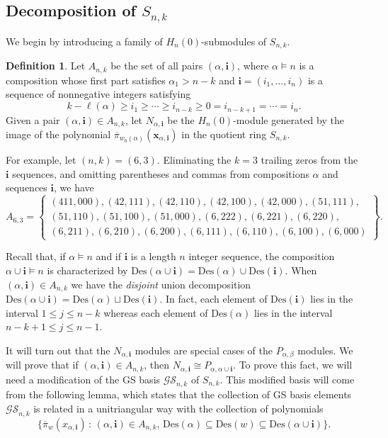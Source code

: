 \documentclass[10pt]{amsart}
\theoremstyle{definition}
\newtheorem{defn}[theorem]{Definition}
\newcommand{\Des}{{\mathrm {Des}}}
\newcommand{\GS}{{\mathcal{GS}}}
\newcommand{\xx}{{\mathbf {x}}}
\newcommand{\ii}{{\mathbf{i}}}
\newcommand{\pib}{\overline{\pi}}
\begin{document}
\subsection{Decomposition of $S_{n,k}$}
We begin by introducing a family of $H_n(0)$-submodules of $S_{n,k}$.

\begin{defn}
Let $A_{n,k}$ be the set of all pairs $(\alpha, \ii)$, where $\alpha \models n$ 
is a composition whose first part satisfies $\alpha_1> n-k$
and $\ii = (i_1, \dots, i_n)$ is a sequence of nonnegative integers satisfying 
\begin{equation*}
k - \ell(\alpha) \geq i_1 \geq \cdots \geq i_{n-k} \geq 0 = i_{n-k+1} = \cdots = i_n.
\end{equation*}
Given a pair $(\alpha, \ii) \in A_{n,k}$, let $N_{\alpha,\ii}$ be the $H_n(0)$-module
generated by the image of the polynomial $\pib_{w_0(\alpha)}(\xx_{\alpha,\ii})$ in the quotient ring $S_{n,k}$.
\end{defn}

For example, let $(n,k) = (6,3)$.  Eliminating the $k = 3$ trailing zeros from the $\ii$ sequences, and omitting
parentheses and commas from compositions $\alpha$ and sequences $\ii$, we have
\begin{equation*}
A_{6,3} = \left\{ 
\begin{matrix}
(411, 000), (42, 111), (42, 110), (42, 100), (42, 000),
(51, 111), \\
(51, 110), (51, 100), (51,000), (6, 222), (6,221), (6,220), \\
(6,211),(6,210), (6,200), (6,111), (6,110), (6,100), (6,000)
\end{matrix}
 \right\}.
\end{equation*}




Recall that, if $\alpha \models n$ and if $\ii$ is a length $n$ integer sequence, the composition
$\alpha \cup \ii \models n$ is characterized by $\Des(\alpha \cup \ii ) = \Des(\alpha) \cup \Des(\ii)$.
When $(\alpha, \ii) \in A_{n,k}$ we have the \emph{disjoint} union decomposition
$\Des(\alpha \cup \ii) = \Des(\alpha) \sqcup \Des(\ii)$.  In fact, each element of $\Des(\ii)$ lies in the interval
$1 \leq j \leq n-k$ whereas each element of $\Des(\alpha)$ lies in the interval $n-k+1 \leq j \leq n-1$.

It will turn out that the $N_{\alpha,\ii}$ modules are special cases of the $P_{\alpha,\beta}$ modules.
We will prove that if $(\alpha, \ii) \in A_{n,k}$, then 
$N_{\alpha,\ii} \cong P_{\alpha,\alpha \cup \ii}$.
To prove this fact, we will need a modification of the GS basis $\GS_{n,k}$ of $S_{n,k}$.
This modified basis will come from the following lemma, which 
states that the collection of GS basis elements $\GS_{n,k}$
is related in a unitriangular way with the collection of polynomials
\begin{equation*}
\{ \pib_w(x_{\alpha,\ii}) \,:\, 
(\alpha,\ii) \in A_{n,k}, \, \Des(\alpha) \subseteq \Des(w) \subseteq \Des(\alpha \cup \ii) \}.
\end{equation*}
\end{document}
